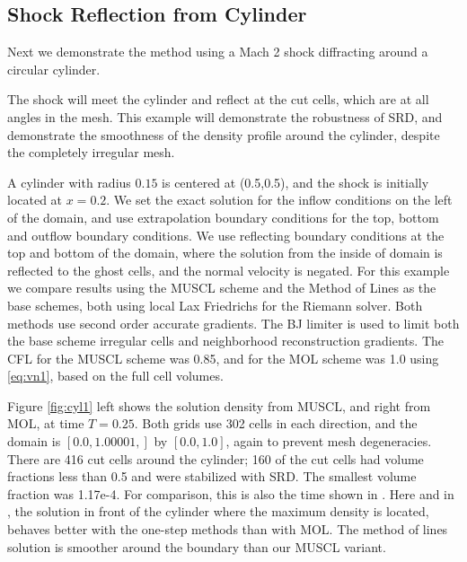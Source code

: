 \subsection{Shock Reflection from  Cylinder}
Next we demonstrate the method using a Mach 2
shock diffracting around a circular cylinder. 

The shock will meet the cylinder and reflect at the cut cells, which are
at all angles in the mesh. This
example will demonstrate the robustness of SRD, and demonstrate the
smoothness of the density profile around the cylinder, despite the
completely irregular mesh.

A cylinder with radius $0.15$ is centered at
(0.5,0.5), and the shock is initially located at $x = 0.2$.
We set the exact solution for the inflow conditions on the left of the
domain, and use extrapolation boundary conditions for the top, bottom
and outflow boundary conditions.  We use reflecting
boundary conditions at the top and bottom of the domain, where the
solution from the inside of domain is reflected to the ghost cells, and
the normal velocity is negated. 
For this example we compare results using the MUSCL scheme and
the Method of Lines as the base schemes, both using local Lax Friedrichs for the Riemann
solver. Both methods use second order accurate gradients. The BJ 
limiter is used to limit
both the base scheme irregular cells  and neighborhood reconstruction gradients. 
The CFL for the MUSCL scheme was 0.85, and for the MOL
scheme was 1.0 using \eqref{eq:vn1}, based on the full cell volumes.

Figure \ref{fig:cyl1} left shows the solution density from MUSCL, and
right from MOL, at time $T=0.25$. 
Both grids use 302 cells in each
direction, and the domain is  $[0.0,1.00001,]$ by  $[0.0, 1.0]$, again to
prevent mesh degeneracies.
There are 416 cut cells
around the cylinder; 160 of the cut cells had volume fractions less than
0.5 and were stabilized with SRD.  The smallest volume fraction was 1.17e-4.   
For comparison, this is also the time shown in \cite{mjb-hel-rjl:hbox2}. 
Here and in \cite{mjb-hel-rjl:hbox2}, the solution in front of the cylinder 
where the
maximum density is located, behaves better with the one-step methods than with
MOL.  The method of lines solution is smoother around the boundary than our
MUSCL variant. 

